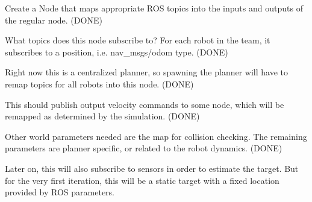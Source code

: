 \begin{DoxyItemize}
\item Create a Node that maps appropriate R\+OS topics into the inputs and outputs of the regular node. (D\+O\+NE)
\item What topics does this node subscribe to? For each robot in the team, it subscribes to a position, i.\+e. nav\+\_\+msgs/odom type. (D\+O\+NE)
\item Right now this is a centralized planner, so spawning the planner will have to remap topics for all robots into this node. (D\+O\+NE)
\item This should publish output velocity commands to some node, which will be remapped as determined by the simulation. (D\+O\+NE)
\item Other world parameters needed are the map for collision checking. The remaining parameters are planner specific, or related to the robot dynamics. (D\+O\+NE)
\item Later on, this will also subscribe to sensors in order to estimate the target. But for the very first iteration, this will be a static target with a fixed location provided by R\+OS parameters. 
\end{DoxyItemize}